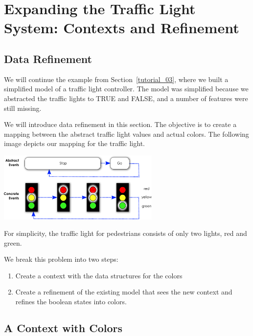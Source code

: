 \section{Expanding the Traffic Light System: Contexts and Refinement}
\label{tutorial_07}


\subsection{Data Refinement}

We will continue the example from Section~\ref{tutorial_03}, where we built a simplified model of a traffic light controller.  The model was simplified because we abstracted the traffic lights to TRUE and FALSE, and a number of features were still missing.

We will introduce data refinement in this section.  The objective is to create a mapping between the abstract traffic light values and actual colors.  The following image depicts our mapping for the traffic light.

\begin{center}
	\includegraphics[width=0.60\textwidth]{img/tutorial/tl-colors.png}
	\label{fig:tl-colors}
\end{center}

For simplicity, the traffic light for pedestrians consists of only two lights, red and green.

We break this problem into two steps:

\begin{enumerate}
	\item Create a context with the data structures for the colors
	\item Create a refinement of the existing model that sees the new context and refines the boolean states into colors.
\end{enumerate}

\subsection{A Context with Colors}

